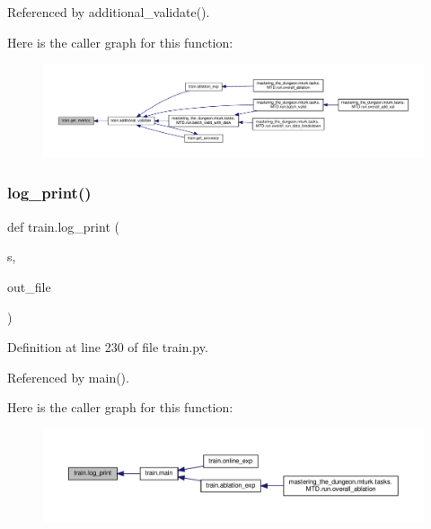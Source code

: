 Referenced by additional\+\_\+validate().

Here is the caller graph for this function\+:
\nopagebreak
\begin{figure}[H]
\begin{center}
\leavevmode
\includegraphics[width=350pt]{namespacetrain_ad644487baaf3b94d8a6b32b0f6e88e15_icgraph}
\end{center}
\end{figure}
\mbox{\label{namespacetrain_a2322df3364c6be0dfcbd3d13d9a4745e}} 
\subsubsection{\texorpdfstring{log\+\_\+print()}{log\_print()}}
{\footnotesize\ttfamily def train.\+log\+\_\+print (\begin{DoxyParamCaption}\item[{}]{s,  }\item[{}]{out\+\_\+file }\end{DoxyParamCaption})}



Definition at line 230 of file train.\+py.



Referenced by main().

Here is the caller graph for this function\+:
\nopagebreak
\begin{figure}[H]
\begin{center}
\leavevmode
\includegraphics[width=350pt]{namespacetrain_a2322df3364c6be0dfcbd3d13d9a4745e_icgraph}
\end{center}
\end{figure}
\mbox{\label{namespacetrain_a6e1c17af3a14f1cd1b54ee54ccf5a77b}} 

